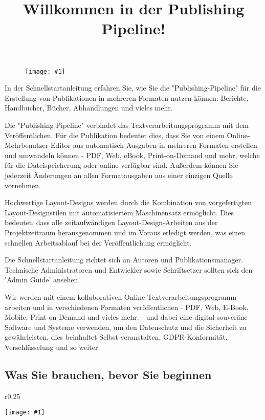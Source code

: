 \documentclass{article}
\newlength{\imgwidth}
\newcommand\scaledgraphics[2]{%
                
\settowidth{\imgwidth}{\texttt{[image: \#1]}}%
                
\setlength{\imgwidth}{\minof{\imgwidth}{#2\textwidth}}%
                
\texttt{[image: \#1]}%
                
}
\begin{document}
\title{Willkommen in der Publishing Pipeline!}

\maketitle

\begin{figure}
\scaledgraphics{b3bc6ba5-db38-4ec8-89db-45c029fdb485.png}{0.75}
\label{F98934631}
\end{figure}


In der Schnellstartanleitung erfahren Sie, wie Sie die "Publishing-Pipeline" für die Erstellung von Publikationen in mehreren Formaten nutzen können: Berichte, Handbücher, Bücher, Abhandlungen und vieles mehr.


Die "Publishing Pipeline" verbindet das Textverarbeitungsprogramm mit dem Veröffentlichen. Für die Publikation bedeutet dies, dass Sie von einem Online-Mehrbenutzer-Editor aus automatisch Ausgaben in mehreren Formaten erstellen und umwandeln können - PDF, Web, eBook, Print-on-Demand und mehr, welche für die Dateispeicherung oder online verfügbar sind. Außerdem können Sie jederzeit Änderungen an allen Formatausgaben aus einer einzigen Quelle vornehmen.


Hochwertige Layout-Designs werden durch die Kombination von vorgefertigten Layout-Designstilen mit automatisiertem Maschinensatz ermöglicht. Dies bedeutet, dass alle zeitaufwändigen Layout-Design-Arbeiten aus der Projektzeitraum herausgenommen und im Voraus erledigt werden, was einen schnellen Arbeitsablauf bei der Veröffentlichung ermöglicht.


Die Schnellstartanleitung richtet sich an Autoren und Publikationsmanager. Technische Administratoren und Entwickler sowie Schriftsetzer sollten sich den 'Admin Guide' ansehen.


Wir werden mit einem kollaborativen Online-Textverarbeitungsprogramm arbeiten und in verschiedenen Formaten veröffentlichen - PDF, Web, E-Book, Mobile, Print-on-Demand und vieles mehr. - und dabei eine digital souveräne Software und Systeme verwenden, um den Datenschutz und die Sicherheit zu gewährleisten, dies beinhaltet Selbst veranstalten, GDPR-Konformität, Verschlüsselung und so weiter.


\subsection{Was Sie brauchen, bevor Sie beginnen}\label{H4632171}


\begin{wrapfigure}{r}{0.25\textwidth}
\scaledgraphics{fec439eb-c4d6-4587-a4a2-affde7c45586.png}{0.25}
\label{F18710661}
\end{wrapfigure}
\end{document}
